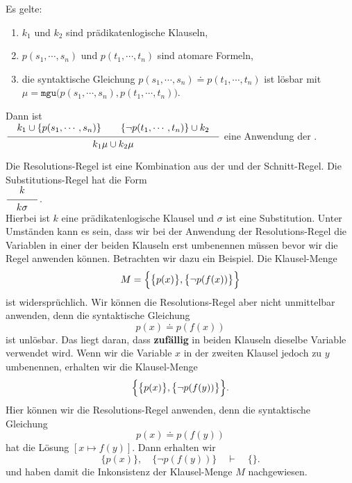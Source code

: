 \begin{Definition} 
    Es gelte:
    \begin{enumerate}
    \item $k_1$ und $k_2$ sind prädikatenlogische Klauseln,
    \item $p(s_1,\cdots,s_n)$ und $p(t_1,\cdots,t_n)$ sind atomare Formeln,
    \item die syntaktische Gleichung $p(s_1,\cdots,s_n)  \doteq p(t_1,\cdots,t_n)$ ist lösbar mit 
          \\[0.2cm]
          \hspace*{1.3cm}
          $\mu = \mathtt{mgu}\bigl(p(s_1,\cdots,s_n), p(t_1,\cdots,t_n)\bigr)$. 
    \end{enumerate}
     Dann ist 
     \\[0.2cm]
     \hspace*{1.3cm}
     $\schluss{k_1 \cup\{ p(s_1,\cdots,s_n)\} \quad\quad \{\neg p(t_1,\cdots,t_n)\} \cup k_2}{
                 k_1\mu \cup k_2\mu} 
     $
     eine Anwendung der .
     \eox
\end{Definition}
Die Resolutions-Regel ist eine Kombination aus der  und der 
Schnitt-Regel.  Die Substitutions-Regel hat die Form
\\[0.2cm]
\hspace*{1.3cm}
$\schluss{k}{k\sigma}$. 
\\[0.2cm]
Hierbei ist $k$ eine prädikatenlogische Klausel und $\sigma$ ist eine Substitution.
Unter Umständen kann es sein, dass wir bei der Anwendung der Resolutions-Regel 
die Variablen in einer der beiden Klauseln erst umbenennen
müssen bevor wir die Regel anwenden können.  Betrachten wir dazu ein Beispiel.
Die Klausel-Menge 
\[ M = \Bigl\{ \bigl\{ p(x) \bigr\}, \bigl\{ \neg p(f(x)) \bigr\} \Bigr\} \]
ist widersprüchlich.  Wir können die Resolutions-Regel aber nicht unmittelbar anwenden,
denn die syntaktische Gleichung 
\[ p(x) \doteq p(f(x)) \]
ist unlösbar.  Das liegt daran, dass \textbf{zufällig} in beiden Klauseln dieselbe Variable
verwendet wird.  Wenn wir die Variable $x$ in der zweiten Klausel jedoch zu $y$ umbenennen, erhalten
wir die Klausel-Menge 
\[ \Bigl\{ \bigl\{ p(x) \bigr\}, \bigl\{ \neg p(f(y)) \bigr\} \Bigr\}. \]
Hier können wir die Resolutions-Regel anwenden, denn die syntaktische Gleichung 
\[ p(x) \doteq p(f(y)) \]
hat die Lösung $[x \mapsto f(y)]$.  Dann erhalten wir 
\[ \bigl\{ p(x) \bigr\}, \quad \bigl\{ \neg p(f(y)) \bigr\} \quad \vdash \quad \{\}. \]
und haben damit die Inkonsistenz der Klausel-Menge $M$ nachgewiesen.

